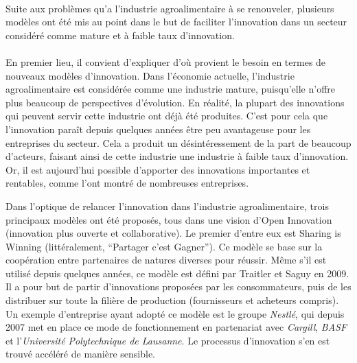 \documentclass[a4paper,12pt]{report}
\begin{document}
		\paragraph{}Suite aux problèmes qu’a l’industrie agroalimentaire à se renouveler, plusieurs modèles ont été mis au point dans le but de faciliter l’innovation dans un secteur considéré comme mature et à faible taux d’innovation.
			
		\paragraph{}En premier lieu, il convient d’expliquer d’où provient le besoin en termes de nouveaux modèles d’innovation. Dans l’économie actuelle, l’industrie agroalimentaire est considérée comme une industrie mature, puisqu’elle n’offre plus beaucoup de perspectives d’évolution. En réalité, la plupart des innovations qui peuvent servir cette industrie ont déjà été produites. C’est pour cela que l’innovation paraît depuis quelques années être peu avantageuse pour les entreprises du secteur. Cela a produit un désintéressement de la part de beaucoup d’acteurs, faisant ainsi de cette industrie une industrie à faible taux d’innovation. Or, il est aujourd’hui possible d’apporter des innovations importantes et rentables, comme l’ont montré de nombreuses entreprises.
			
			Dans l’optique de relancer l’innovation dans l’industrie agroalimentaire, trois principaux modèles ont été proposés, tous dans une vision d’Open Innovation (innovation plus ouverte et collaborative)\cite{OpenInnovation}. Le premier d’entre eux est Sharing is Winning (littéralement, “Partager c’est Gagner”)\cite{SiW}. Ce modèle se base sur la coopération entre partenaires de natures diverses pour réussir. Même s’il est utilisé depuis quelques années, ce modèle est défini par Traitler et Saguy en 2009. Il a pour but de partir d’innovations proposées par les consommateurs, puis de les distribuer sur toute la filière de production (fournisseurs et acheteurs compris)\cite{OIFr}. Un exemple d’entreprise ayant adopté ce modèle est le groupe \textit{Nestlé}\cite{NestleOI}, qui depuis 2007 met en place ce mode de fonctionnement en partenariat avec \textit{Cargill}, \textit{BASF} et l'\textit{Université Polytechnique de Lausanne}. Le processus d’innovation s’en est trouvé accéléré de manière sensible.	
			
\end{document}
